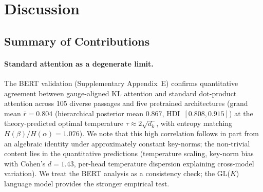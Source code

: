 \documentclass[twoside,11pt]{article}
\begin{document}


\section{Discussion}

\subsection{Summary of Contributions}

\paragraph{Standard attention as a degenerate limit.} The BERT validation (Supplementary Appendix~E) confirms quantitative agreement between gauge-aligned KL attention and standard dot-product attention across 105 diverse passages and five pretrained architectures (grand mean $\bar{r} = 0.804$ (hierarchical posterior mean $0.867$, HDI~$[0.808, 0.915]$) at the theory-predicted optimal temperature $\tau \approx 2\sqrt{d_k}$, with entropy matching $H(\beta)/H(\alpha) = 1.076$). We note that this high correlation follows in part from an algebraic identity under approximately constant key-norms; the non-trivial content lies in the quantitative predictions (temperature scaling, key-norm bias with Cohen's $d = 1.43$, per-head temperature dispersion explaining cross-model variation). We treat the BERT analysis as a consistency check; the GL($K$) language model provides the stronger empirical test.
\end{document}
